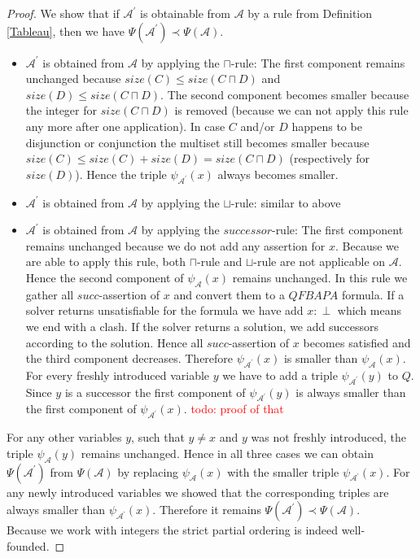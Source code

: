 \documentclass{book}
\theoremstyle{break}
\theoremstyle{definition}
\begin{document}
\begin{proof}
We show that if $\mathcal{A}^\prime$ is obtainable from $\mathcal{A}$ by a rule from Definition \ref{Tableau}, then we have $\Psi(\mathcal{A}^\prime)\prec \Psi(\mathcal{A})$.\\
\begin{itemize}
\item $\mathcal{A}^\prime$ is obtained from $\mathcal{A}$ by applying the $\sqcap$-rule: The first component remains unchanged because $size(C)\leq size(C\sqcap D)$ and $size(D)\leq size(C\sqcap D)$. The second component becomes smaller because the integer for $size(C\sqcap D)$ is removed (because we can not apply this rule any more after one application). In case $C$ and/or $D$ happens to be disjunction or conjunction the multiset still becomes smaller because $size(C)\leq size(C)+size(D)=size(C\sqcap D)$ (respectively for $size(D)$). Hence the triple $\psi_{\mathcal{A}^\prime}(x)$ always becomes smaller.
\item $\mathcal{A}^\prime$ is obtained from $\mathcal{A}$ by applying the $\sqcup$-rule: similar to above
\item $\mathcal{A}^\prime$ is obtained from $\mathcal{A}$ by applying the $successor$-rule: The first component remains unchanged because we do not add any assertion for $x$.  Because we are able to apply this rule, both $\sqcap$-rule and $\sqcup$-rule are not applicable on $\mathcal{A}$. Hence the second component of $\psi_\mathcal{A}(x)$ remains unchanged. In this rule we gather all $succ$-assertion of $x$ and convert them to a $QFBAPA$ formula. If a solver returns unsatisfiable for the formula we have add $x:\perp$ which means we end with a clash. If the solver returns a solution, we add successors according to the solution. Hence all $succ$-assertion of $x$ becomes satisfied and the third component decreases. Therefore $\psi_{\mathcal{A}^\prime}(x)$ is smaller than $\psi_\mathcal{A}(x)$.\\
For every freshly introduced variable $y$ we have to add a triple $\psi_{\mathcal{A}^\prime}(y)$ to $Q$. Since $y$ is a successor the first component of $\psi_{\mathcal{A}^\prime}(y)$ is always smaller than the first component of $\psi_{\mathcal{A}^\prime}(x)$. \textcolor{red}{todo: proof of that}
\end{itemize}
For any other variables $y$, such that $y\neq x$ and $y$ was not freshly introduced, the triple $\psi_\mathcal{A}(y)$ remains unchanged. Hence in all three cases we can obtain $\Psi(\mathcal{A}^\prime)$ from $\Psi(\mathcal{A})$ by replacing $\psi_\mathcal{A}(x)$ with the smaller triple $\psi_{\mathcal{A}^\prime}(x)$. For any newly introduced variables we showed that the corresponding triples are always smaller than $\psi_{\mathcal{A}^\prime}(x)$. Therefore it remains $\Psi(\mathcal{A}^\prime)\prec\Psi(\mathcal{A})$. \\
Because we work with integers the strict partial ordering is indeed well-founded.
\end{proof}
\end{document}
